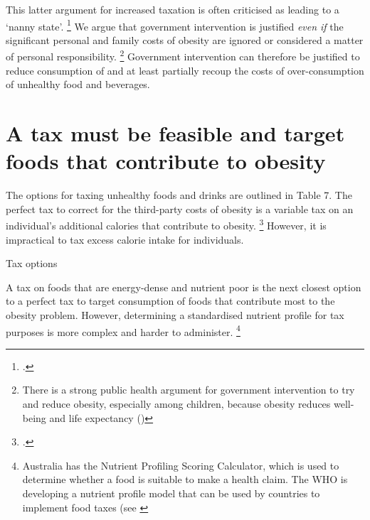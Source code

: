 \documentclass[embargoed]{grattan}
\begin{document}
This latter argument for increased taxation is often criticised as leading to a `nanny state'.%
\footcites{Novak2012Nannystatetaxes}{Keane2016Sugarohhoney}{Lesh2016Greenssoftdrinks}{Elliott2016TomElliottsays} We argue that government intervention is justified \emph{even if} the significant personal and family costs of obesity are ignored or considered a matter of personal responsibility.%
\footnote{There is a strong public health argument for government intervention to try and reduce obesity, especially among children, because obesity reduces well-being and life expectancy (\textcites{Roberto2015Patchyprogressobesity}{Waters2011Interventionspreventingobesity}{Ewart-Pierce2016WholeCommunityObesity})} Government intervention can therefore be justified to reduce consumption of and at least partially recoup the costs of over-consumption of unhealthy food and beverages.

\section{A tax must be feasible and target foods that contribute to obesity }\label{a-tax-must-be-feasible-and-target-foods-that-contribute-to-obesity}

The options for taxing unhealthy foods and drinks are outlined in Table 7.
The perfect tax to correct for the third-party costs of obesity is a variable tax on an individual's additional calories that contribute to obesity.%
\footcite{Freebairn2010Taxationobesity} However, it is impractical to tax excess calorie intake for individuals.

\begin{table}
\caption{Tax options}



\end{table}

A tax on foods that are energy-dense and nutrient poor is the next closest option to a perfect tax to target consumption of foods that contribute most to the obesity problem.
However, determining a standardised nutrient profile for tax purposes is more complex and harder to administer.%
\footnote{Australia has the Nutrient Profiling Scoring Calculator, which is used to determine whether a food is suitable to make a health claim.
The WHO is developing a nutrient profile model that can be used by countries to implement food taxes (see \textcite{Organization2016FiscalPoliciesDiet}}
\end{document}
